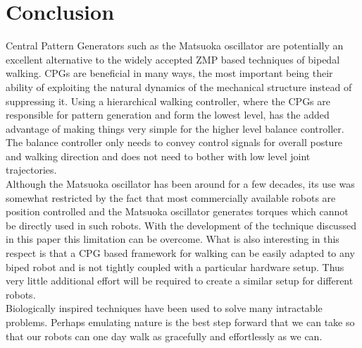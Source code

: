 \documentclass[12pt,twoside]{article}
\theoremstyle{plain}
\theoremstyle{definition}
\theoremstyle{remark}
\newcommand{\forceindent}{\leavevmode{\parindent=2em\indent}}
\begin{document}
\section{Conclusion}
\label{sec:Conclusion}
Central Pattern Generators such as the Matsuoka oscillator are potentially an excellent alternative to the widely accepted ZMP based techniques of bipedal walking. CPGs are beneficial in many ways, the most important being their ability of exploiting the natural dynamics of the mechanical structure instead of suppressing it. Using a hierarchical walking controller, where the CPGs are responsible for pattern generation and form the lowest level, has the added advantage of making things very simple for the higher level balance controller. The balance controller only needs to convey control signals for overall posture and walking direction and does not need to bother with low level joint trajectories.\\
\forceindent Although the Matsuoka oscillator has been around for a few decades, its use was somewhat restricted by the fact that most commercially available robots are position controlled and the Matsuoka oscillator generates torques which cannot be directly used in such robots. With the development of the technique discussed in this paper this limitation can be overcome. What is also interesting in this respect is that a CPG based framework for walking can be easily adapted to any biped robot and is not tightly coupled with a particular hardware setup. Thus very little additional effort will be required to create a similar setup for different robots.\\
\forceindent Biologically inspired techniques have been used to solve many intractable problems. Perhaps emulating nature is the best step forward that we can take so that our robots can one day walk as gracefully and effortlessly as we can. 

%
%


\end{document}
